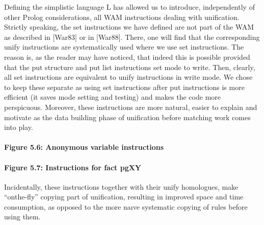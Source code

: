 
Defining the simplistic language L
has allowed us to introduce, independently
of other Prolog considerations, all WAM instructions dealing with unification.
Strictly speaking, the set instructions we have defined are not part of the WAM
as described in [War83] or in [War88]. There, one will find that the corresponding
unify instructions are systematically used where we use set instructions.
The reason is, as the reader may have noticed, that indeed this is possible provided
that the put structure and put list instructions set mode to write.
Then, clearly, all set instructions are equivalent to unify instructions in write
mode. We chose to keep these separate as using set instructions after put instructions
is more efficient (it saves mode setting and testing) and makes the code
more perspicuous. Moreover, these instructions are more natural, easier to explain
and motivate as the data building phase of unification before matching work
comes into play.

\paragraph{Figure 5.6: Anonymous variable instructions}

\paragraph{Figure 5.7: Instructions for fact pgXY}

Incidentally, these instructions together with their unify homologues, make “onthe-fly”
copying part of unification, resulting in improved space and time consumption,
as opposed to the more naıve systematic copying of rules before using
them.